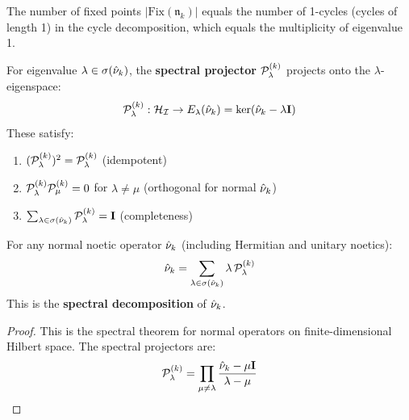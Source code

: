 \begin{corollary}
\label{cor:fixed-cycles}
The number of fixed points $|\mathrm{Fix}(\mathfrak{n}_k)|$ equals the number of 1-cycles (cycles of length 1) in the cycle decomposition, which equals the multiplicity of eigenvalue 1.
\end{corollary}

\begin{definition}
\label{def:spectral-projectors}
For eigenvalue $\lambda \in \sigma(\hat{\nu}_k)$, the \textbf{spectral projector} $\mathcal{P}_\lambda^{(k)}$ projects onto the $\lambda$-eigenspace:
\[
\mathcal{P}_\lambda^{(k)} : \mathcal{H}_{\mathcal{I}} \to E_\lambda(\hat{\nu}_k) = \ker(\hat{\nu}_k - \lambda\mathbf{I})
\]
These satisfy:
\begin{enumerate}
  \item $(\mathcal{P}_\lambda^{(k)})^2 = \mathcal{P}_\lambda^{(k)}$ (idempotent)
  \item $\mathcal{P}_\lambda^{(k)} \mathcal{P}_{\mu}^{(k)} = 0$ for $\lambda \neq \mu$ (orthogonal for normal $\hat{\nu}_k$)
  \item $\sum_{\lambda \in \sigma(\hat{\nu}_k)} \mathcal{P}_\lambda^{(k)} = \mathbf{I}$ (completeness)
\end{enumerate}
\end{definition}

\begin{theorem}
\label{thm:spectral-decomposition}
For any normal noetic operator $\hat{\nu}_k$ (including Hermitian and unitary noetics):
\[
\hat{\nu}_k = \sum_{\lambda \in \sigma(\hat{\nu}_k)} \lambda \, \mathcal{P}_\lambda^{(k)}
\]
This is the \textbf{spectral decomposition} of $\hat{\nu}_k$.
\end{theorem}

\begin{proof}
This is the spectral theorem for normal operators on finite-dimensional Hilbert space. The spectral projectors are:
\[
\mathcal{P}_\lambda^{(k)} = \prod_{\mu \neq \lambda} \frac{\hat{\nu}_k - \mu\mathbf{I}}{\lambda - \mu}
\]
\end{proof}

